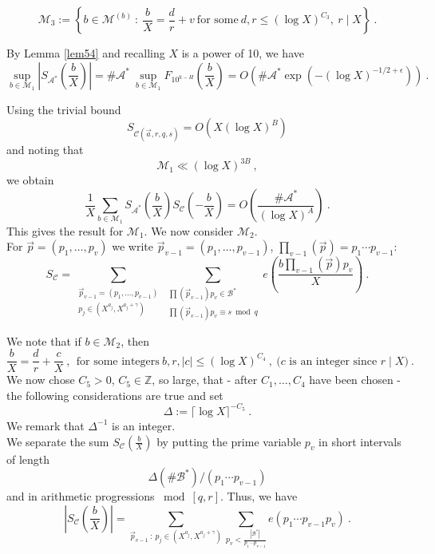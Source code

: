 \documentclass{amsart}
\numberwithin{equation}{subsection}
\begin{document}
$$\mathcal{M}_3:=\left\{b\in \mathcal{M}^{(b)}\::\: \frac{b}{X}=\frac{d}{r}+v\ \text{for some}\ d, r \leq (\log X)^{C_3},\ r\mid X\right\} \:.$$

By Lemma \ref{lem54} and recalling $X$ is a power of 10, we have
$$\sup_{b\in \mathcal{M}_1} \left| S_{\mathcal{A}^*}\left(\frac{b}{X}\right) \right|=\#\mathcal{A}^* \: \sup_{b\in \mathcal{M}_1} F_{10^{k-H}}\left(\frac{b}{X}\right) = O\left( \#\mathcal{A}^*\exp(-(\log X)^{-1/2+\epsilon})\right)\:.$$

Using the trivial bound 
$$S_{\mathcal{C}(\vec{a}, r, q, s)}=O(X(\log X)^B)$$ 
and noting that 
$$\mathcal{M}_1\ll (\log X)^{3B}\:,$$
we obtain
\[
\frac{1}{X}\sum_{b\in \mathcal{M}_1} S_{\mathcal{A}^*}\left(\frac{b}{X}\right) S_{\mathcal{C}}\left(-\frac{b}{X}\right)=O\left( \frac{\#\mathcal{A}^*}{(\log X)^A} \right)\:. \tag{9.1}
\]
This gives the result for $\mathcal{M}_1$. We now consider $\mathcal{M}_2$.\\
For $\vec{p}=(p_1, \ldots, p_v)$ we write $\vec{p}_{v-1}=(p_1, \ldots, p_{v-1})$, $\prod_{v-1}(\vec{p})=p_1\cdots p_{v-1}$:
$$S_{\mathcal{C}}=\sum_{\substack{\vec{p}_{v-1}=(p_1, \ldots, p_{v-1}) \\ p_j\in (X^{a_j}, X^{a_j+\gamma})}} \sum_{\substack{\prod(\vec{p}_{v-1})p_v \in \mathcal{B}^* \\  \prod(\vec{p}_{v-1})p_v \equiv s\bmod q }} e\left(\frac{b\prod_{v-1}(\vec{p})p_v}{X}\right)\:.$$

We note that if $b\in \mathcal{M}_2$, then
$$\frac{b}{X}=\frac{d}{r}+\frac{c}{X}\:,\ \ \text{for some integers}\ b, r, |c|\leq (\log X)^{C_4}\:,\ \text{($c$ is an integer since $r\mid X$)}\:.$$
We now chose $C_5>0$, $C_5\in\mathbb{Z}$, so large, that - after $C_1,\ldots, C_4$ have been chosen - the following considerations are true and set
$$\Delta:=\lceil \log X \rceil^{-C_5}\:.$$
We remark that $\Delta^{-1}$ is an integer.\\
We separate the sum $S_{\mathcal{C}}\left(\frac{b}{X}\right)$ by putting the prime variable $p_v$ in short intervals of length
$$\Delta(\#\mathcal{B}^*)/(p_1\cdots p_{v-1})$$
and in arithmetic progressions $\bmod [q, r]$. Thus, we have
$$\left|S_\mathcal{C}\left(\frac{b}{X}\right) \right| =\sum_{\vec{p}_{v-1}\::\: p_j\in (X^{a_j}, X^{a_j+\gamma})} \sum_{p_v<\frac{|\mathcal{B}^*|}{p_1\cdots p_{v-1}}} e(p_1\cdots p_{v-1}p_v)\:.$$
\end{document}
